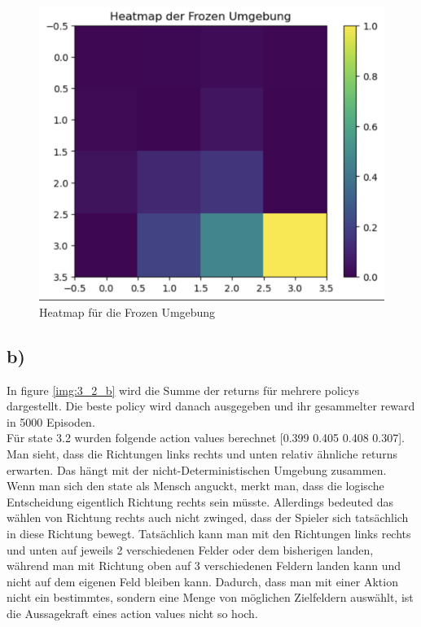 \documentclass[11pt]{article}
\begin{document}
\begin{figure}
    \centering
    \includegraphics[width=\textwidth]{img/frozen_heatmap.png}
    \caption{Heatmap für die Frozen Umgebung}
    \label{img:heatmap}
\end{figure}

\subsection*{b)}
In figure \ref{img:3_2_b} wird die Summe der returns für mehrere policys dargestellt.
Die beste policy wird danach ausgegeben und ihr gesammelter reward in 5000 Episoden. \\

Für state 3.2 wurden folgende action values berechnet [0.399 0.405 0.408 0.307].
Man sieht, dass die Richtungen links rechts und unten relativ ähnliche returns erwarten.
Das hängt mit der nicht-Deterministischen Umgebung zusammen. Wenn man sich den state als Mensch anguckt, merkt man, dass die logische Entscheidung eigentlich Richtung rechts sein müsste.
Allerdings bedeuted das wählen von Richtung rechts auch nicht zwinged, dass der Spieler sich tatsächlich in diese Richtung bewegt. Tatsächlich kann man mit den Richtungen links rechts und unten
auf jeweils 2 verschiedenen Felder oder dem bisherigen landen, während man mit Richtung oben auf 3 verschiedenen Feldern landen kann und nicht auf dem eigenen Feld bleiben kann.
Dadurch, dass man mit einer Aktion nicht ein bestimmtes, sondern eine Menge von möglichen Zielfeldern auswählt, ist die Aussagekraft eines action values nicht so hoch.
\end{document}
